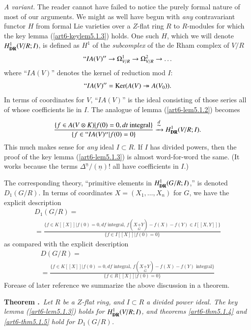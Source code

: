 \noindent
{\em A variant.} The reader cannot have failed to notice the purely formal nature of most of our arguments. We might as well have begun with {\em any} contravariant functor $H$ from formal Lie varieties over a $Z$-flat ring $R$ to $R$-modules for which the key lemma (\ref{art6-keylem5.1.3}) holds. One such $H$, which we will denote $H^{1}_{\mathbf{DR}}(V/R;I)$, is defined as $H^{1}$ of the {\em subcomplex} of the de Rham complex of $V/R$
$$
``IA(V)''\to \Omega^{1}_{V/R}\to \Omega^{2}_{V/R}\to \ldots
$$
where ``$IA(V)$'' denotes the kernel of reduction mod $I$:
$$
``IA(V)''=\operatorname{Ker}(A(V)\twoheadrightarrow A(V_{0})).
$$
In terms of coordinates for $V$, ``$IA(V)$'' is the ideal consisting of those series all of whose coefficients lie in $I$. The analogue of lemma (\ref{art6-lem5.1.2}) becomes
$$
\frac{\{f\in A(V\otimes K)|f(0)=0,dt\text{~integral}\}}{\{f\in ``IA(V)''|f(0)=0\}}\xrightarrow{\displaystyle{\mathop{\sim}\limits^{d}}}H^{1}_{\mathbf{DR}}(V/R;I).
$$
This much makes sense for {\em any} ideal $I\subset R$. If $I$ has divided powers, then the proof of the key lemma (\ref{art6-lem5.1.3}) is almost word-for-word the same. (It works because the terms $\Delta^{\underline{n}}/(\underline{n})!$ all have coefficients in $I$.)

The corresponding theory, ``primitive elements in $H^{1}_{\mathbf{DR}}(G/R;I)$,'' is denoted $D_{1}(G/R)$. In terms of coordinates $X=(X_{1},\ldots,X_{n})$ for $G$, we have the explicit description
\begin{multline*}
D_{1}(G/R)=\\
=\frac{\{f\in K[[X]]|f(0)=0,df\text{~integral, } f(X{\displaystyle{\mathop{+}\limits_{G}}Y})-f(X)-f(Y)\in I[[X,Y]]\}}{\{f\in I[[X]]|f(0)=0\}}
\end{multline*}
as compared with the explicit description
\begin{multline*}
D(G/R)=\\
=\frac{\{f\in K[[X]]|f(0)=0,df\text{~integral, } f(X{\displaystyle{\mathop{+}\limits_{G}}Y})-f(X)-f(Y)\text{~integral}\}}{\{f\in R[[X]]|f(0)=0\}}
\end{multline*}
For\pageoriginale ease of later reference we summarize the above discussion in a theorem.

\medskip
\noindent
{\bf Theorem .\label{art6-thm5.1.6}}~{\em Let $R$ be a $Z$-flat ring, and $I\subset R$ a divided power ideal. The key lemma (\ref{art6-lem5.1.3}) holds for $H^{1}_{\mathbf{DR}}(V/R;I)$, and theorems \eqref{art6-thm5.1.4} and \eqref{art6-thm5.1.5} hold for $D_{1}(G/R)$.}
\smallskip


